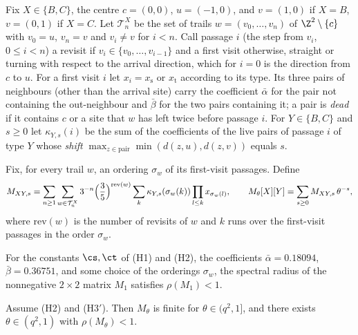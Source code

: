 Fix $X \in \{B, C\}$, the centre $c = (0, 0)$, $u = (-1, 0)$, and $v = (1, 0)$ if $X = B$, $v = (0, 1)$ if $X = C$. Let $\mathcal T^X_n$ be the set of trails $w = (v_0, \dots, v_n)$ of $\Z^2 \setminus \{c\}$ with $v_0 = u$, $v_n = v$ and $v_i \neq v$ for $i < n$. Call passage $i$ (the step from $v_i$, $0 \le i < n$) a revisit if $v_i \in \{v_0, \dots, v_{i - 1}\}$ and a first visit otherwise, straight or turning with respect to the arrival direction, which for $i = 0$ is the direction from $c$ to $u$. For a first visit $i$ let $x_i = x_{\mathrm s}$ or $x_{\mathrm t}$ according to its type. Its three pairs of neighbours (other than the arrival site) carry the coefficient $\bar\alpha$ for the pair not containing the out-neighbour and $\bar\beta$ for the two pairs containing it; a pair is \emph{dead} if it contains $c$ or a site that $w$ has left twice before passage $i$. For $Y \in \{B, C\}$ and $s \ge 0$ let $\kappa_{Y, s}(i)$ be the sum of the coefficients of the live pairs of passage $i$ of type $Y$ whose \emph{shift} $\max_{z \in \text{pair}} \min(d(z, u), d(z, v))$ equals $s$.

Fix, for every trail $w$, an ordering $\sigma_w$ of its first-visit passages. Define
\begin{equation}\label{e:kernel}
M_{XY, s} = \sum_{n \ge 1} \sum_{w \in \mathcal T^X_n} 3^{-n} \Bigl( \frac35 \Bigr)^{\mathrm{rev}(w)} \sum_{k} \kappa_{Y, s}(\sigma_w(k)) \prod_{l \le k} x_{\sigma_w(l)}, \qquad M_\theta[X][Y] = \sum_{s \ge 0} M_{XY, s} \, \theta^{-s},
\end{equation}
where $\mathrm{rev}(w)$ is the number of revisits of $w$ and $k$ runs over the first-visit passages in the order $\sigma_w$.

\begin{hypothesis}[H3$'$]\label{h:H3}
For the constants $\cs, \ct$ of (H1) and (H2), the coefficients $\bar\alpha = 0.18094$, $\bar\beta = 0.36751$, and some choice of the orderings $\sigma_w$, the spectral radius of the nonnegative $2 \times 2$ matrix $M_1$ satisfies $\rho(M_1) < 1$.
\end{hypothesis}

\begin{lemma}\label{l:Mtheta}
Assume (H2) and (H3$'$). Then $M_\theta$ is finite for $\theta \in (q^2, 1]$, and there exists $\theta \in (q^2, 1)$ with $\rho(M_\theta) < 1$.
\end{lemma}

